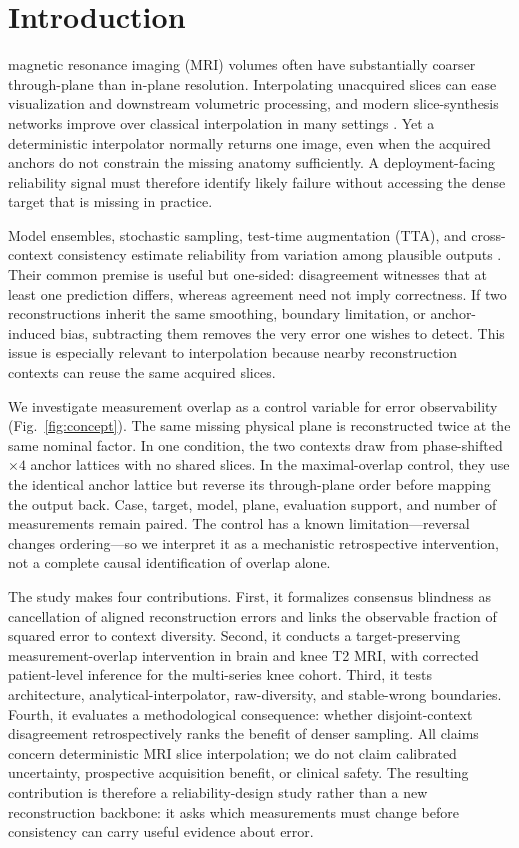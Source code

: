 \documentclass[journal,10pt]{IEEEtran}
\begin{document}
\section{Introduction}
 magnetic resonance imaging (MRI) volumes often have substantially coarser through-plane than in-plane resolution. Interpolating unacquired slices can ease visualization and downstream volumetric processing, and modern slice-synthesis networks improve over classical interpolation in many settings \cite{peng2020saint,song2024i3net}. Yet a deterministic interpolator normally returns one image, even when the acquired anchors do not constrain the missing anatomy sufficiently. A deployment-facing reliability signal must therefore identify likely failure without accessing the dense target that is missing in practice.

Model ensembles, stochastic sampling, test-time augmentation (TTA), and cross-context consistency estimate reliability from variation among plausible outputs \cite{gal2016dropout,lakshminarayanan2017ensembles,edupuganti2021uncertainty,narnhofer2022bayesian}. Their common premise is useful but one-sided: disagreement witnesses that at least one prediction differs, whereas agreement need not imply correctness. If two reconstructions inherit the same smoothing, boundary limitation, or anchor-induced bias, subtracting them removes the very error one wishes to detect. This issue is especially relevant to interpolation because nearby reconstruction contexts can reuse the same acquired slices.

We investigate measurement overlap as a control variable for error observability (Fig.~\ref{fig:concept}). The same missing physical plane is reconstructed twice at the same nominal factor. In one condition, the two contexts draw from phase-shifted $\times4$ anchor lattices with no shared slices. In the maximal-overlap control, they use the identical anchor lattice but reverse its through-plane order before mapping the output back. Case, target, model, plane, evaluation support, and number of measurements remain paired. The control has a known limitation---reversal changes ordering---so we interpret it as a mechanistic retrospective intervention, not a complete causal identification of overlap alone.

The study makes four contributions. First, it formalizes consensus blindness as cancellation of aligned reconstruction errors and links the observable fraction of squared error to context diversity. Second, it conducts a target-preserving measurement-overlap intervention in brain and knee T2 MRI, with corrected patient-level inference for the multi-series knee cohort. Third, it tests architecture, analytical-interpolator, raw-diversity, and stable-wrong boundaries. Fourth, it evaluates a methodological consequence: whether disjoint-context disagreement retrospectively ranks the benefit of denser sampling. All claims concern deterministic MRI slice interpolation; we do not claim calibrated uncertainty, prospective acquisition benefit, or clinical safety. The resulting contribution is therefore a reliability-design study rather than a new reconstruction backbone: it asks which measurements must change before consistency can carry useful evidence about error.
\end{document}
